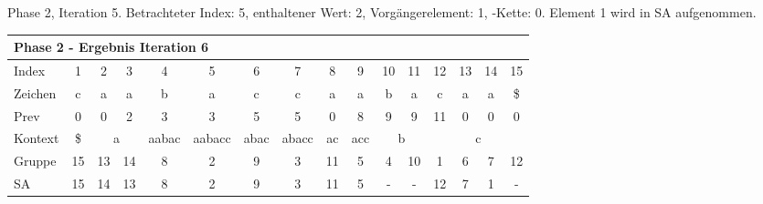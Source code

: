 \begin{table}[H]
\caption[Phase 2, Iteration 5]{Phase 2, Iteration 5. Betrachteter Index: 5, enthaltener Wert: 2, Vorgängerelement: 1, \prevpointer-Kette: 0. Element 1 wird in SA aufgenommen.}
\label{table_complex_example_2_5} 
\end{table}

\begin{table}[H]
\centering
\begin{adjustbox}{max width=\textwidth}
\centering
\begin{tabular}{lccccccccccccccc}
\multicolumn{16}{l}{Phase 2 - Ergebnis Iteration 6}                                                                                                                                                                                                                                                                                        \\ \hline
\multicolumn{1}{l|}{Index}   & 1                       & 2  & 3                       & 4                          & 5                           & 6                                              & 7                          & 8                       & 9                        & 10 & 11                      & 12  & 13  & 14  & 15  \\
\multicolumn{1}{l|}{Zeichen} & c                       & a  & a                       & b                          & a                           & c                                              & c                          & a                       & a                        & b  & a                       & c   & a   & a   & \$  \\
\multicolumn{1}{l|}{Prev}    & 0                       & 0  & 2                       & 3                          & 3                           & 5                                              & 5                          & 0                       & 8                        & 9  & 9                       & 11  & 0   & 0   & 0   \\ \hline
\multicolumn{1}{l|}{Kontext} & \multicolumn{1}{c|}{\$} & \multicolumn{2}{c|}{a}       & \multicolumn{1}{c|}{aabac} & \multicolumn{1}{c|}{aabacc} & \multicolumn{1}{c|}{abac}                      & \multicolumn{1}{c|}{abacc} & \multicolumn{1}{c|}{ac} & \multicolumn{1}{c|}{acc} & \multicolumn{2}{c|}{b}       & \multicolumn{4}{c}{c} \\
\multicolumn{1}{l|}{Gruppe}  & \multicolumn{1}{c|}{15} & 13 & \multicolumn{1}{c|}{14} & \multicolumn{1}{c|}{8}     & \multicolumn{1}{c|}{2}      & \multicolumn{1}{c|}{9}                         & \multicolumn{1}{c|}{3}     & \multicolumn{1}{c|}{11} & \multicolumn{1}{c|}{5}   & 4  & \multicolumn{1}{c|}{10} & 1   & 6   & 7   & 12  \\
\multicolumn{1}{l|}{SA}      & \multicolumn{1}{c|}{15} & 14 & \multicolumn{1}{c|}{13} & \multicolumn{1}{c|}{8}     & \multicolumn{1}{c|}{2}      & \multicolumn{1}{c|}{\cellcolor[HTML]{\green}9} & \multicolumn{1}{c|}{3}     & \multicolumn{1}{c|}{11} & \multicolumn{1}{c|}{5}   & -  & \multicolumn{1}{c|}{-}  & 12  & 7   & 1   & -  
\end{tabular}
\end{adjustbox}


\end{table}
